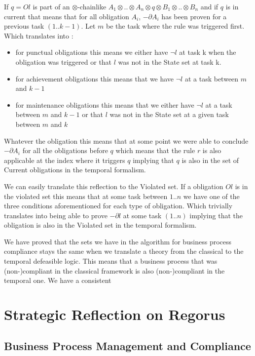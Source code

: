 \documentclass[10pt]{report}
\newcommand{\ochain}{$\otimes$-chain}
\begin{document}
If $q=Ol$ is part of an \ochain like $A_{1}\otimes .. \otimes A_{n} \otimes q \otimes B_{1} \otimes .. \otimes B_{n}$ and if $q$ is in current that means that for all obligation $A_{i}$, $-\partial A_{i}$ has been proven for a previous task $(1..k-1)$. Let $m$ be the task where the rule was triggered first. Which translates into :
\begin{itemize}
\item for punctual obligations this means we either have $\neg l$ at task k when the obligation was triggered or that $l$ was not in the State set at task k.
\item for achievement obligations this means that we have $\neg l$ at a task between $m$ and $k-1$
\item for maintenance obligations this means that we either have $\neg l$ at a task between $m$ and $k-1$ or that $l$ was not in the State set at a given task between $m$ and $k$ 
\end{itemize}

Whatever the obligation this means that at some point we were able to conclude $-\partial A_{i}$ for all the obligations before $q$ which means that the rule $r$ is also applicable at the index where it triggers $q$ implying that $q$ is also in the set of Current obligations in the temporal formalism.

We can easily translate this reflection to the Violated set. If a obligation $Ol$ is in the violated set this means that at some task between $1..n$ we have one of the three conditions aforementioned for each type of obligation. Which trivially translates into being able to prove $-\partial l$ at some task $(1..n)$ implying that the obligation is also in the Violated set in the temporal formalism.

We have proved that the sets we have in the algorithm for business process compliance stays the same when we translate a theory from the classical to the temporal defeasible logic. This means that a business process that was (non-)compliant in the classical framework is also (non-)compliant in the temporal one. We have a consistent 

\newpage
{}
\chapter{ Strategic Reflection on Regorus}

\section{Business Process Management and Compliance}
\end{document}
